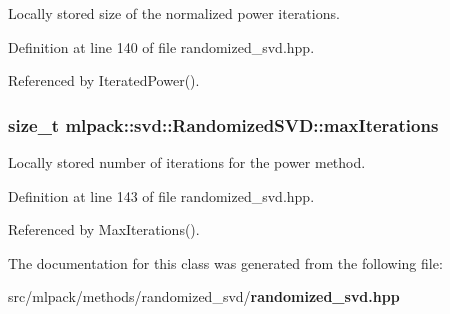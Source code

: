 Locally stored size of the normalized power iterations. 



Definition at line 140 of file randomized\+\_\+svd.\+hpp.



Referenced by Iterated\+Power().

\subsubsection[{max\+Iterations}]{\setlength{\rightskip}{0pt plus 5cm}size\+\_\+t mlpack\+::svd\+::\+Randomized\+S\+V\+D\+::max\+Iterations\hspace{0.3cm}{\ttfamily [private]}}\label{classmlpack_1_1svd_1_1RandomizedSVD_ab80fc947e7ce20772539bebae51bc884}


Locally stored number of iterations for the power method. 



Definition at line 143 of file randomized\+\_\+svd.\+hpp.



Referenced by Max\+Iterations().



The documentation for this class was generated from the following file\+:\begin{DoxyCompactItemize}
\item 
src/mlpack/methods/randomized\+\_\+svd/{\bf randomized\+\_\+svd.\+hpp}\end{DoxyCompactItemize}
